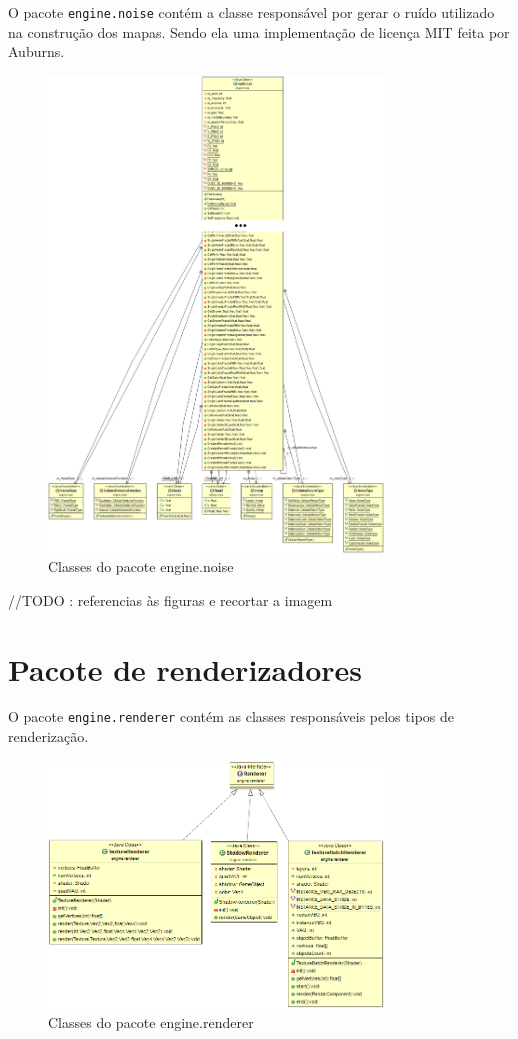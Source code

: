 \documentclass[12pt, 
openright, 
oneside, 
a4paper,    
brazil]{facom-ufu-abntex2}
\begin{document}
O pacote \texttt{engine.noise} contém a classe responsável por gerar o ruído utilizado na construção dos mapas. Sendo ela uma implementação de licença MIT feita por Auburns.

\begin{figure}[H]
	\centering
	\includegraphics[width=24em]{imagens/engine.noise.png}
	\caption{Classes do pacote engine.noise}
\end{figure}
//TODO : referencias às figuras e recortar a imagem


\section{Pacote de renderizadores}

O pacote \texttt{engine.renderer} contém as classes responsáveis pelos tipos de renderização.

\begin{figure}[H]
	\centering
	\includegraphics[width=24em]{imagens/engine.renderer.png}
	\caption{Classes do pacote engine.renderer}
\end{figure}
\end{document}
